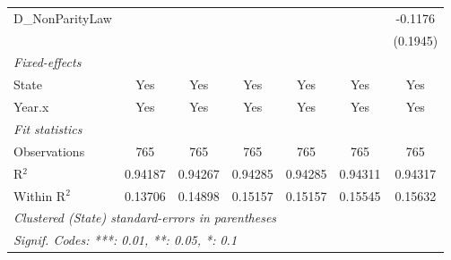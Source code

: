 \begin{tabular}{lcccccc}
   D\_NonParityLaw                &                &                &                 &                 &                 & -0.1176\\   
                                  &                &                &                 &                 &                 & (0.1945)\\   
   \midrule
   \emph{Fixed-effects}\\
   State                          & Yes            & Yes            & Yes             & Yes             & Yes             & Yes\\  
   Year.x                         & Yes            & Yes            & Yes             & Yes             & Yes             & Yes\\  
   \midrule
   \emph{Fit statistics}\\
   Observations                   & 765            & 765            & 765             & 765             & 765             & 765\\  
   R$^2$                          & 0.94187        & 0.94267        & 0.94285         & 0.94285         & 0.94311         & 0.94317\\  
   Within R$^2$                   & 0.13706        & 0.14898        & 0.15157         & 0.15157         & 0.15545         & 0.15632\\  
   \midrule \midrule
   \multicolumn{7}{l}{\emph{Clustered (State) standard-errors in parentheses}}\\
   \multicolumn{7}{l}{\emph{Signif. Codes: ***: 0.01, **: 0.05, *: 0.1}}\\
\end{tabular}
\par\endgroup


